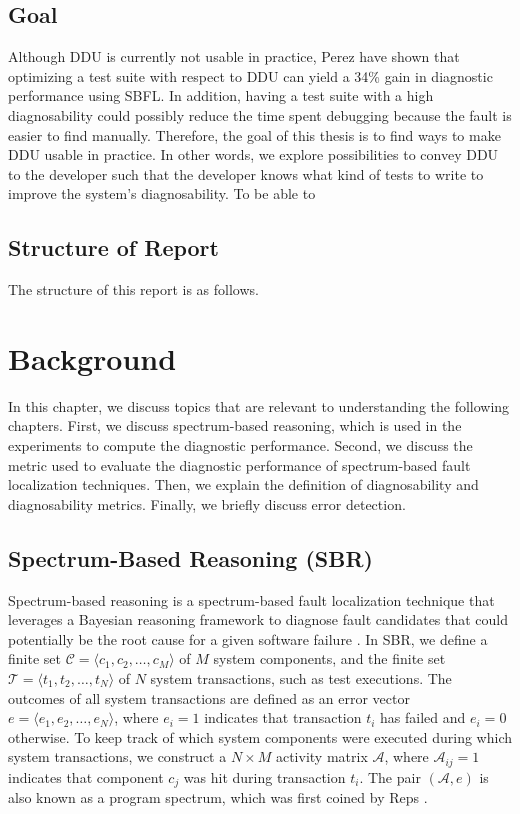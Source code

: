 \documentclass[twoside,a4paper,11pt]{memoir}
\begin{document}
\section{Goal}
Although DDU is currently not usable in practice, Perez \etal \cite{DBLP:conf/icse/PerezAD17} have shown that optimizing a test suite with respect to DDU can yield a 34\% gain in diagnostic performance using SBFL.
In addition, having a test suite with a high diagnosability could possibly reduce the time spent debugging because the fault is easier to find manually.
Therefore, the goal of this thesis is to find ways to make DDU usable in practice.
In other words, we explore possibilities to convey DDU to the developer such that the developer knows what kind of tests to write to improve the system's diagnosability.
To be able to


\section{Structure of Report}
The structure of this report is as follows.

\chapter{Background}
\label{ch:background}

In this chapter, we discuss topics that are relevant to understanding the following chapters.
First, we discuss spectrum-based reasoning, which is used in the experiments to compute the diagnostic performance.
Second, we discuss the metric used to evaluate the diagnostic performance of spectrum-based fault localization techniques.
Then, we explain the definition of diagnosability and diagnosability metrics.
Finally, we briefly discuss error detection.

\section{Spectrum-Based Reasoning (SBR)}
Spectrum-based reasoning is a spectrum-based fault localization technique that leverages a Bayesian reasoning framework to diagnose fault candidates that could potentially be the root cause for a given software failure \cite{abreu2009spectrum}.
In SBR, we define a finite set $\mathcal{C} = \langle c_1, c_2, \ldots, c_M \rangle$ of $M$ system components, and the finite set $\mathcal{T} = \langle t_1, t_2, \ldots, t_N \rangle$ of $N$ system transactions, such as test executions.
The outcomes of all system transactions are defined as an error vector $e = \langle e_1, e_2, \ldots, e_N \rangle$, where $e_i = 1$ indicates that transaction $t_i$ has failed and $e_i = 0$ otherwise.
To keep track of which system components were executed during which system transactions, we construct a $N \times M$ activity matrix $\mathcal{A}$, where $\mathcal{A}_{ij} = 1$ indicates that component $c_j$ was hit during transaction $t_i$.
The pair $(\mathcal{A}, e)$ is also known as a program spectrum, which was first coined by Reps \etal \cite{reps1997use}.
\end{document}
